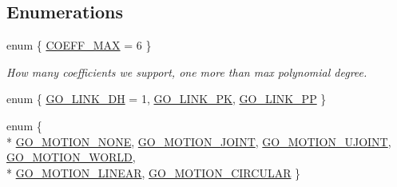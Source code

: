 \subsection*{Enumerations}
\begin{DoxyCompactItemize}
\item 
enum \{ \hyperlink{namespacegomotion_ada59e79a297fc10f2dbc85e4777fa4aea0d345844cda261ed2253d7fc9404e2ef}{C\-O\-E\-F\-F\-\_\-\-M\-A\-X} = 6
 \}
\begin{DoxyCompactList}\small\item\em How many coefficients we support, one more than max polynomial degree. \end{DoxyCompactList}\item 
enum \{ \hyperlink{namespacegomotion_a5b5a03fc09c09e262c6941325f7beb17afd19d6aee8f10a912a656a2e01650b62}{G\-O\-\_\-\-L\-I\-N\-K\-\_\-\-D\-H} = 1, 
\hyperlink{namespacegomotion_a5b5a03fc09c09e262c6941325f7beb17a7b78cd6a637ea7ae037ec521ef34b8ab}{G\-O\-\_\-\-L\-I\-N\-K\-\_\-\-P\-K}, 
\hyperlink{namespacegomotion_a5b5a03fc09c09e262c6941325f7beb17acbaa1fd4ed04f6ed93cc5296baaf6b78}{G\-O\-\_\-\-L\-I\-N\-K\-\_\-\-P\-P}
 \}
\item 
enum \{ \\*
\hyperlink{namespacegomotion_a82062c31fb510f6d6810ba83bf8a3c12ac47bceaf1669bb9214788f7b09d51eb8}{G\-O\-\_\-\-M\-O\-T\-I\-O\-N\-\_\-\-N\-O\-N\-E}, 
\hyperlink{namespacegomotion_a82062c31fb510f6d6810ba83bf8a3c12a4dfd8a68dda6ffe82c50ad931121576c}{G\-O\-\_\-\-M\-O\-T\-I\-O\-N\-\_\-\-J\-O\-I\-N\-T}, 
\hyperlink{namespacegomotion_a82062c31fb510f6d6810ba83bf8a3c12a51b15689f867451eefd6bfa544867779}{G\-O\-\_\-\-M\-O\-T\-I\-O\-N\-\_\-\-U\-J\-O\-I\-N\-T}, 
\hyperlink{namespacegomotion_a82062c31fb510f6d6810ba83bf8a3c12ab73840e3ff8f43a33e770cc18527bf97}{G\-O\-\_\-\-M\-O\-T\-I\-O\-N\-\_\-\-W\-O\-R\-L\-D}, 
\\*
\hyperlink{namespacegomotion_a82062c31fb510f6d6810ba83bf8a3c12aa864f102b66c4fb339cdc3448f4ae3a8}{G\-O\-\_\-\-M\-O\-T\-I\-O\-N\-\_\-\-L\-I\-N\-E\-A\-R}, 
\hyperlink{namespacegomotion_a82062c31fb510f6d6810ba83bf8a3c12a4f3cd483df8a1589b29c5be3d58ea712}{G\-O\-\_\-\-M\-O\-T\-I\-O\-N\-\_\-\-C\-I\-R\-C\-U\-L\-A\-R}
 \}
\end{DoxyCompactItemize}
